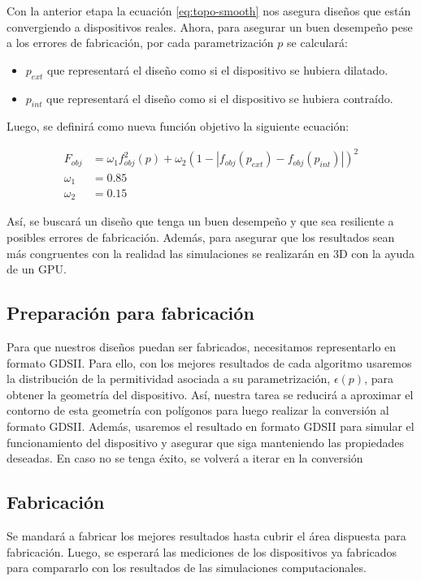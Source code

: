 Con la anterior etapa la ecuación \ref{eq:topo-smooth} nos asegura diseños que están convergiendo a dispositivos reales.
Ahora, para asegurar un buen desempeño pese a los errores de fabricación, por cada parametrización $p$ se calculará:

\begin{itemize}
  \item $p_{ext}$ que representará el diseño como si el dispositivo se hubiera dilatado.
  \item $p_{int}$ que representará el diseño como si el dispositivo se hubiera contraído.
\end{itemize}

Luego, se definirá como nueva función objetivo la siguiente ecuación:

\begin{equation}
  \begin{split}
    F_{obj} &= \omega_1 f^2_{obj}(p) + \omega_2 (1 - |f_{obj}(p_{ext}) - f_{obj}(p_{int})|)^2\\
    \omega_1 &= 0.85\\
    \omega_2 &= 0.15
  \end{split}
  \label{eq:final-fom}
\end{equation}

Así, se buscará un diseño que tenga un buen desempeño y que sea resiliente a posibles errores de fabricación.
Además, para asegurar que los resultados sean más congruentes con la realidad las simulaciones se realizarán en 3D con la ayuda de un GPU.

\subsection{Preparación para fabricación}

Para que nuestros diseños puedan ser fabricados, necesitamos representarlo en formato GDSII.
Para ello, con los mejores resultados de cada algoritmo usaremos la distribución de la permitividad asociada a su parametrización, $\epsilon(p)$,
para obtener la geometría del dispositivo.
Así, nuestra tarea se reducirá a aproximar el contorno de esta geometría con polígonos para luego realizar la conversión al formato GDSII.
Además, usaremos el resultado en formato GDSII para simular el funcionamiento del dispositivo y asegurar que siga manteniendo las propiedades deseadas.
En caso no se tenga éxito, se volverá a iterar en la conversión

\subsection{Fabricación}

Se mandará a fabricar los mejores resultados hasta cubrir el área dispuesta para fabricación. 
Luego, se esperará las mediciones de los dispositivos ya fabricados para compararlo con los resultados de las simulaciones computacionales.
